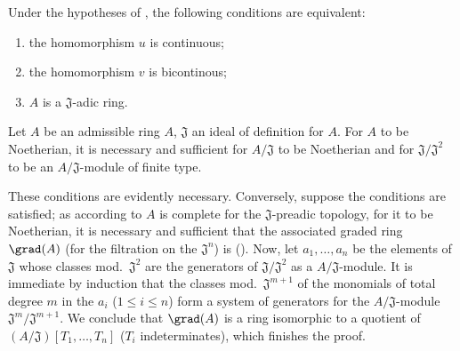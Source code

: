 \begin{corollary}[7.2.5]
\label{0.7.2.5}
Under the hypotheses of , the following conditions are
equivalent:
\begin{enumerate}
  \item[{\rm(a)}] the homomorphism $u$ is continuous;
  \item[{\rm(b)}] the homomorphism $v$ is bicontinous;
  \item[{\rm(c)}] $A$ is a $\mathfrak{J}$-adic ring.
\end{enumerate}
\end{corollary}

\begin{corollary}[7.2.6]
\label{0.7.2.6}
Let $A$ be an admissible ring $A$, $\mathfrak{J}$ an ideal of definition for $A$.
For $A$ to be Noetherian, it is necessary and sufficient for $A/\mathfrak{J}$ to be Noetherian and for $\mathfrak{J}/\mathfrak{J}^2$ to be an $A/\mathfrak{J}$-module of finite type.
\end{corollary}

These conditions are evidently necessary. Conversely, suppose the conditions
are satisfied; as according to  $A$ is complete for the
$\mathfrak{J}$-preadic topology, for it to be Noetherian, it is necessary and sufficient
that the associated graded ring $\grad(A)$ (for the filtration on the
$\mathfrak{J}^n$) is (\cite[p~.18--07, th.~4]{I-1}). Now, let $a_1,\dots,a_n$ be
the elements of $\mathfrak{J}$ whose classes mod.~$\mathfrak{J}^2$ are the
generators of $\mathfrak{J}/\mathfrak{J}^2$ as a $A/\mathfrak{J}$-module. It
is immediate by induction that the classes mod.~$\mathfrak{J}^{m+1}$ of the
monomials of total degree $m$ in the $a_i$ ($1\leq i\leq n$) form a
system of generators for the $A/\mathfrak{J}$-module
$\mathfrak{J}^m/\mathfrak{J}^{m+1}$. We conclude that $\grad(A)$ is a ring
isomorphic to a quotient of $(A/\mathfrak{J})[T_1,\dots,T_n]$ ($T_i$
indeterminates), which finishes the proof.


